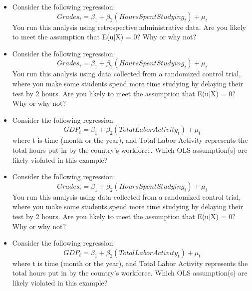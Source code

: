 \documentclass[11pt]{article}
\begin{document}
\begin{itemize}
\item Consider the following regression: 
\begin{equation*}
Grades_i = \beta_1 + \beta_2 (Hours Spent Studying_i) + \mu_i
\end{equation*}
You run this analysis using retrospective administrative data. Are you likely to meet the assumption that E(u$\mid$X) = 0? Why or why  not?
\vspace{0.35in}

\vspace{0.35in}


\item Consider the following regression: 
\begin{equation*}
Grades_i = \beta_1 + \beta_2 (Hours Spent Studying_i) + \mu_i
\end{equation*}
You run this analysis using data collected from a randomized control trial, where you make some students spend more time studying by delaying their test by 2 hours. Are you likely to meet the assumption that E(u$\mid$X) = 0? Why or why  not?
\vspace{0.35in}

\item  Consider the following regression: 
\begin{equation*}
GDP_t = \beta_1 + \beta_2 (Total Labor Activity_t) + \mu_t
\end{equation*}
where t is time (month or the year), and Total Labor Activity represents the total hours put in by the country's workforce. Which OLS assumption(s) are likely violated in this example?

\vspace{2in}


\item Consider the following regression: 
\begin{equation*}
Grades_i = \beta_1 + \beta_2 (Hours Spent Studying_i) + \mu_i
\end{equation*}
You run this analysis using data collected from a randomized control trial, where you make some students spend more time studying by delaying their test by 2 hours. Are you likely to meet the assumption that E(u$\mid$X) = 0? Why or why  not?
\vspace{0.35in}

\item  Consider the following regression: 
\begin{equation*}
GDP_t = \beta_1 + \beta_2 (Total Labor Activity_t) + \mu_t
\end{equation*}
where t is time (month or the year), and Total Labor Activity represents the total hours put in by the country's workforce. Which OLS assumption(s) are likely violated in this example?

\end{itemize}
\end{document}

